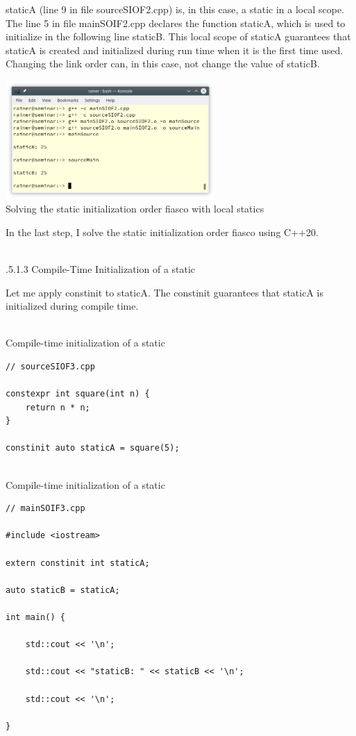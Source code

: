 staticA (line 9 in file sourceSIOF2.cpp) is, in this case, a static in a local scope. The line 5 in file mainSOIF2.cpp declares the function staticA, which is used to initialize in the following line staticB. This local scope of staticA guarantees that staticA is created and initialized during run time when it is the first time used. Changing the link order can, in this case, not change the value of staticB.

\begin{center}
\includegraphics[width=0.6\textwidth]{content/3/chapter4/images/38.png}\\
Solving the static initialization order fiasco with local statics
\end{center}

In the last step, I solve the static initialization order fiasco using C++20.

\hspace*{\fill} \\ %
.5.1.3\hspace{0.2cm} Compile-Time Initialization of a static

Let me apply constinit to staticA. The constinit guarantees that staticA is initialized during compile time.

\hspace*{\fill} \\ %
\noindent
Compile-time initialization of a static
\begin{lstlisting}[style=styleCXX]
// sourceSIOF3.cpp

constexpr int square(int n) {
	return n * n;
}

constinit auto staticA = square(5);
\end{lstlisting}

\hspace*{\fill} \\ %
\noindent
Compile-time initialization of a static
\begin{lstlisting}[style=styleCXX]
// mainSOIF3.cpp

#include <iostream>

extern constinit int staticA;

auto staticB = staticA;

int main() {
	
	std::cout << '\n';
	
	std::cout << "staticB: " << staticB << '\n';
	
	std::cout << '\n';

}
\end{lstlisting}


